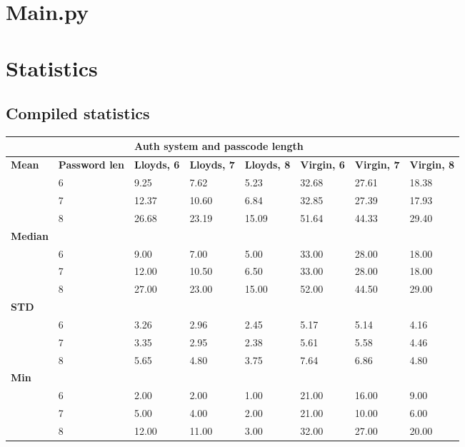\documentclass[british,11pt,a4paper]{article}
\begin{document}
\begin{appendices}
	\section{Main.py}\label{app:main}
		

	\section{Statistics}\label{app:extra_stats}
	\subsection{Compiled statistics}
	\begin{table}[!htb]
		\centering
		\begin{tabular}{|l|l|l|l|l|l|l|l|}
		\hline
		& & \multicolumn{6}{l|}{\textbf{Auth system and passcode length}} \\ \hline
		\textbf{Mean} & \textbf{Password len} & \textbf{Lloyds, 6} & \textbf{Lloyds, 7} & \textbf{Lloyds, 8} & \textbf{Virgin, 6} & \textbf{Virgin, 7} & \textbf{Virgin, 8} \\ \hline
		 & 6 & 9.25 & 7.62 & 5.23 & 32.68 & 27.61 & 18.38 \\ \hline
		 & 7 & 12.37 & 10.60 & 6.84 & 32.85 & 27.39 & 17.93 \\ \hline
		 & 8 & 26.68 & 23.19 & 15.09 & 51.64 & 44.33 & 29.40 \\ \hline
		\textbf{Median} &  &  &  &  &  &  &  \\ \hline
		 & 6 & 9.00 & 7.00 & 5.00 & 33.00 & 28.00 & 18.00 \\ \hline
		 & 7 & 12.00 & 10.50 & 6.50 & 33.00 & 28.00 & 18.00 \\ \hline
		 & 8 & 27.00 & 23.00 & 15.00 & 52.00 & 44.50 & 29.00 \\ \hline
		\textbf{STD} &  &  &  &  &  &  &  \\ \hline
		 & 6 & 3.26 & 2.96 & 2.45 & 5.17 & 5.14 & 4.16 \\ \hline
		 & 7 & 3.35 & 2.95 & 2.38 & 5.61 & 5.58 & 4.46 \\ \hline
		 & 8 & 5.65 & 4.80 & 3.75 & 7.64 & 6.86 & 4.80 \\ \hline
		\textbf{Min} &  &  &  &  &  &  &  \\ \hline
		 & 6 & 2.00 & 2.00 & 1.00 & 21.00 & 16.00 & 9.00 \\ \hline
		 & 7 & 5.00 & 4.00 & 2.00 & 21.00 & 10.00 & 6.00 \\ \hline
		 & 8 & 12.00 & 11.00 & 3.00 & 32.00 & 27.00 & 20.00 \\ \hline

\end{tabular}
\end{table}
\end{appendices}
\end{document}
